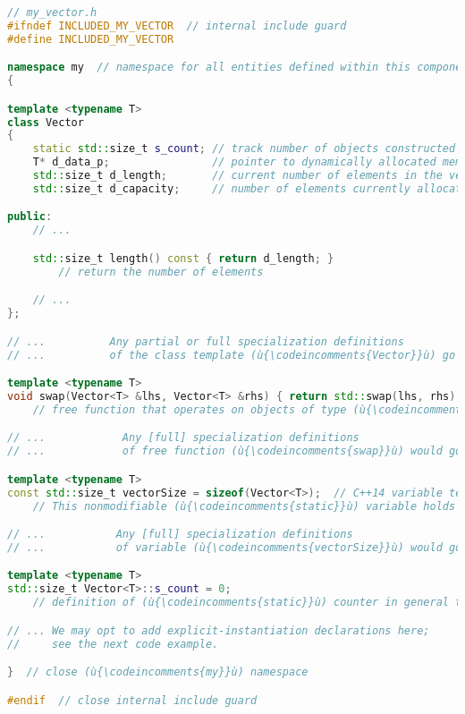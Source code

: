 \begin{lstlisting}[language=C++]
// my_vector.h
#ifndef INCLUDED_MY_VECTOR  // internal include guard
#define INCLUDED_MY_VECTOR

namespace my  // namespace for all entities defined within this component
{

template <typename T>
class Vector
{
    static std::size_t s_count; // track number of objects constructed
    T* d_data_p;                // pointer to dynamically allocated memory
    std::size_t d_length;       // current number of elements in the vector
    std::size_t d_capacity;     // number of elements currently allocated

public:
    // ...

    std::size_t length() const { return d_length; }
        // return the number of elements

    // ...
};

// ...          Any partial or full specialization definitions            ...
// ...          of the class template (ù{\codeincomments{Vector}}ù) go here.                     ...

template <typename T>
void swap(Vector<T> &lhs, Vector<T> &rhs) { return std::swap(lhs, rhs); }
    // free function that operates on objects of type (ù{\codeincomments{my::Vector}}ù) via ADL

// ...            Any [full] specialization definitions                   ...
// ...            of free function (ù{\codeincomments{swap}}ù) would go here.                    ...

template <typename T>
const std::size_t vectorSize = sizeof(Vector<T>);  // C++14 variable template
    // This nonmodifiable (ù{\codeincomments{static}}ù) variable holds the size of a (ù{\codeincomments{my::Vector<T>}}ù).

// ...           Any [full] specialization definitions                    ...
// ...           of variable (ù{\codeincomments{vectorSize}}ù) would go here.                    ...

template <typename T>
std::size_t Vector<T>::s_count = 0;
    // definition of (ù{\codeincomments{static}}ù) counter in general template

// ... We may opt to add explicit-instantiation declarations here; 
//     see the next code example.

}  // close (ù{\codeincomments{my}}ù) namespace

#endif  // close internal include guard
\end{lstlisting}
    

